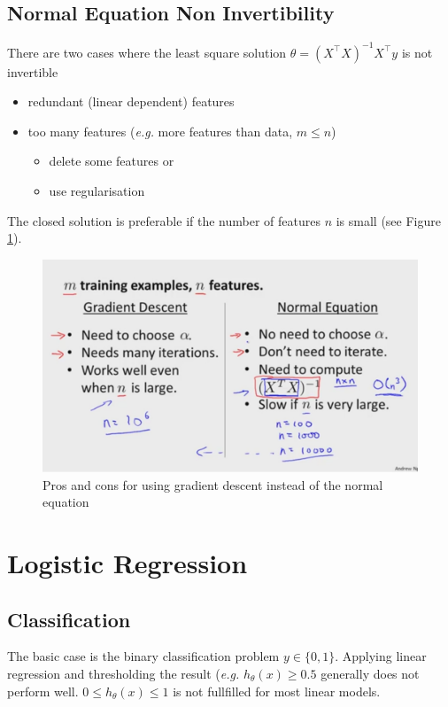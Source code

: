 \documentclass[a4paper,twoside,10pt]{article}
\begin{document}
\subsection{Normal Equation Non Invertibility}
There are two cases where the least square solution $\theta=(X^\top X)^{-1}X^\top y$ is not invertible
\begin{itemize}
  \item redundant (linear dependent) features
  \item too many features (\emph{e.g.} more features than data, $m\le n$)
    \begin{itemize}
      \item delete some features or
      \item use regularisation
    \end{itemize}
\end{itemize}
The closed solution is preferable if the number of features $n$ is small (see Figure \ref{fig:gcp}).
\begin{figure}[htbp]
  \begin{center}
    \includegraphics[width=.6\textwidth]{gradientproscons}
    \caption{Pros and cons for using gradient descent instead of the normal equation\citep{andrewng}\label{fig:gcp}}
  \end{center}
\end{figure}

\section{Logistic Regression}
\subsection{Classification}
The basic case is the binary classification problem $y\in\{0,1\}$.
Applying linear regression and thresholding the result (\emph{e.g.} $h_\theta(x)\ge 0.5$ generally does not perform well.
$0\le h_\theta(x)\le 1$ is not fullfilled for most linear models.
\end{document}
